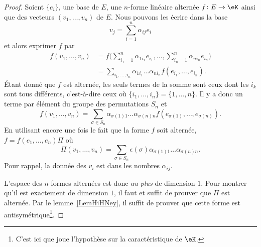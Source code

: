 \begin{proof}
	Soient \( \{ e_i \}\), une base de \( E\), une \( n\)-forme linéaire alternée \( f\colon E\to \eK\) ainsi que des vecteurs \( (v_1,\ldots, v_n)\) de \( E\). Nous pouvons les écrire dans la base
	\begin{equation}
		v_j=\sum_{i=1}^n\alpha_{ij}e_i
	\end{equation}
	et alors exprimer \( f\) par
	\begin{subequations}
		\begin{align}
			f(v_1,\ldots, v_n) & =f\big( \sum_{i_1=1}^n\alpha_{1i_1}e_{i_1},\ldots, \sum_{i_n=1}^n\alpha_{ni_n}e_{i_n} \big) \\
			                   & =\sum_{i_1,\ldots, i_n}\alpha_{1i_1}\ldots \alpha_{ni_n}f(e_{i_1},\ldots, e_{i_n}).
		\end{align}
	\end{subequations}
	Étant donné que \( f\) est alternée, les seuls termes de la somme sont ceux dont les \( i_k\) sont tous différents, c'est-à-dire ceux où \( \{ i_1,\ldots, i_n \}=\{ 1,\ldots, n \}\). Il y a donc un terme par élément du groupe des permutations \( S_n\) et
	\begin{equation}
		f(v_1,\ldots, v_n)=\sum_{\sigma\in S_n}\alpha_{\sigma(1)1}\ldots \alpha_{\sigma(n)n}f(e_{\sigma(1)},\ldots, e_{\sigma(n)}).
	\end{equation}
	En utilisant encore une fois le fait que la forme \( f\) soit alternée, \( f=f(e_1,\ldots, e_n)\Pi\) où
	\begin{equation}
		\Pi(v_1,\ldots, v_n)=\sum_{\sigma\in S_n}\epsilon(\sigma)\alpha_{\sigma(1)1}\ldots \alpha_{\sigma(n)n}.
	\end{equation}
	Pour rappel, la donnée des \( v_i\) est dans les nombres \( \alpha_{ij}\).

	L'espace des \( n\)-formes alternées est donc \emph{au plus} de dimension \( 1\). Pour montrer qu'il est exactement de dimension \( 1\), il faut et suffit de prouver que \( \Pi\) est alternée. Par le lemme~\ref{LemHiHNey}, il suffit de prouver que cette forme est antisymétrique\footnote{C'est ici que joue l'hypothèse sur la caractéristique de \( \eK\).}.


\end{proof}
